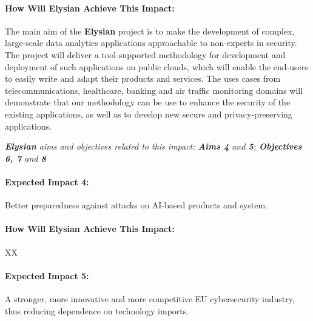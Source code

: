 \documentclass[a4paper,11pt]{article}
\newcommand{\project}[1]{\textbf{#1}\xspace}
\newcommand{\SECURITY}{\project{Elysian}}
\newcommand{\TheProject}{\SECURITY}
\begin{document}
\begin{mdframed}[backgroundcolor=gray!10]
\paragraph{How Will \TheProject{} Achieve This Impact:}
The main aim of the \TheProject{} project is to make the development of complex, large-scale data analytics applications approachable to non-experts in security. The project will deliver a tool-supported methodology for development and deployment of such applications on public clouds, which will enable the end-users to easily write and adapt their products and services. The uses cases from telecommunications, healthcare, banking and air traffic monitoring domains will demonstrate that our methodology can be use to enhance the security of the existing applications, as well as to develop new secure and privacy-preserving applications.

\emph{\TheProject{} aims and objectives related to this impact: \textbf{Aims 4}  and \textbf{5}; \textbf{Objectives 6, 7} and \textbf{8} }

\end{mdframed}

\begin{mdframed}[backgroundcolor=blue!5]
\paragraph{Expected Impact 4:}
Better preparedness against attacks on AI-based products and system.
\end{mdframed}

\begin{mdframed}[backgroundcolor=gray!10]
\paragraph{How Will \TheProject{} Achieve This Impact:}
XX
\end{mdframed}

\begin{mdframed}[backgroundcolor=blue!5]
\paragraph{Expected Impact 5:}
A stronger, more innovative and more competitive EU cybersecurity industry, thus reducing dependence on technology imports.
\end{mdframed}
\end{document}
